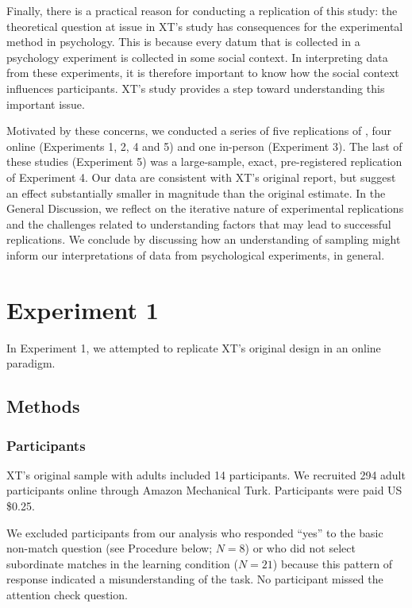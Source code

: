 \documentclass[man]{apa2}
\begin{document}
Finally, there is a practical reason for conducting a replication of this study: the theoretical question at issue in XT's study has consequences for the experimental method in psychology. This is because every datum that is collected in a psychology experiment is collected in some social context. In interpreting data from these experiments, it is therefore important to know how the social context influences participants. XT's study provides a step toward understanding this important issue.

Motivated by these concerns, we conducted a series of five replications of , four online (Experiments 1, 2,  4 and 5) and one in-person (Experiment 3). The last of these studies (Experiment 5) was a large-sample, exact, pre-registered replication of Experiment 4. Our data are consistent with XT's original report, but suggest an effect substantially smaller in magnitude than the original estimate. In the General Discussion, we reflect on the iterative nature of experimental replications and the challenges related to understanding factors that may lead to successful replications. We conclude by discussing how an understanding of sampling might inform our interpretations of data from psychological experiments, in general.

\section{Experiment 1} 
In Experiment 1, we attempted to replicate XT's original design in an online paradigm. 

\subsection{Methods}
\subsubsection{Participants} 
XT's original sample with adults included 14 participants. We recruited 294 adult participants online through Amazon Mechanical Turk. Participants were paid US \$0.25. 

We excluded participants from our analysis who responded ``yes'' to the basic non-match question (see Procedure below; $N=8$) or who did not select subordinate matches in the learning condition ($N = 21$) because this pattern of response indicated a misunderstanding of the task. No participant missed the attention check question. %
\end{document}
